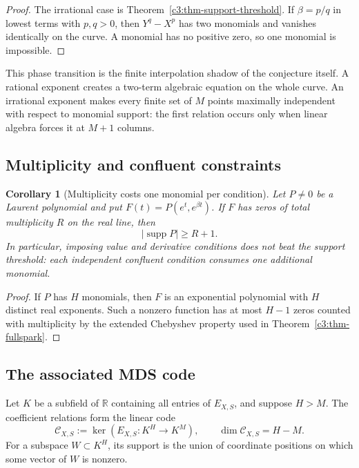 \documentclass[11pt,oneside]{article}
\newtheorem{corollary}[theorem]{Corollary}
\theoremstyle{definition}
\theoremstyle{remark}
\newcommand{\R}{\mathbb R}
\newcommand{\supp}{\operatorname{supp}}
\begin{document}
\begin{proof}
The irrational case is Theorem~\ref{c3:thm-support-threshold}.  If $\beta=p/q$ in lowest
terms with $p,q>0$, then $Y^q-X^p$ has two monomials and vanishes identically on the curve.
A monomial has no positive zero, so one monomial is impossible.
\end{proof}

This phase transition is the finite interpolation shadow of the conjecture itself.  A
rational exponent creates a two-term algebraic equation on the whole curve.  An irrational
exponent makes every finite set of $M$ points maximally independent with respect to monomial
support: the first relation occurs only when linear algebra forces it at $M+1$ columns.

\subsection{Multiplicity and confluent constraints}

\begin{corollary}[Multiplicity costs one monomial per condition]
\label{c3:cor-multiplicity}
Let $P\ne0$ be a Laurent polynomial and put
$F(t)=P(e^t,e^{\beta t})$.  If $F$ has zeros of total multiplicity $R$ on the real line, then
\[
 |\supp P|\ge R+1.
\]
In particular, imposing value and derivative conditions does not beat the support threshold:
each independent confluent condition consumes one additional monomial.
\end{corollary}

\begin{proof}
If $P$ has $H$ monomials, then $F$ is an exponential polynomial with $H$ distinct real
exponents.  Such a nonzero function has at most $H-1$ zeros counted with multiplicity by the
extended Chebyshev property used in Theorem~\ref{c3:thm-fullspark}.
\end{proof}

\subsection{The associated MDS code}

Let $K$ be a subfield of $\R$ containing all entries of $E_{X,S}$, and suppose $H>M$.
The coefficient relations form the linear code
\[
 \mathcal C_{X,S}:=\ker(E_{X,S}:K^H\to K^M),
 \qquad \dim\mathcal C_{X,S}=H-M.
\]
For a subspace $W\subset K^H$, its support is the union of coordinate positions on which
some vector of $W$ is nonzero.
\end{document}
